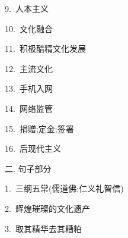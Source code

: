 \documentclass[a4paper, 12pt]{article}
\begin{document}
\begin{multicols}{2}
\begin{flushleft}
9.\ 人本主义 \ \ \ \ \underline{\hspace{3cm}}
\end{flushleft}

\begin{flushleft}
10.\ 文化融合 \ \ \ \ \underline{\hspace{3cm}}
\end{flushleft}
\end{multicols}

\begin{multicols}{2}
\begin{flushleft}
11.\ 积极醋精文化发展 \ \ \ \ \underline{\hspace{3cm}}
\end{flushleft}

\begin{flushleft}
12.\ 主流文化 \ \ \ \ \underline{\hspace{3cm}}
\end{flushleft}
\end{multicols}

\begin{multicols}{2}
\begin{flushleft}
13.\ 手机入网 \ \ \ \ \underline{\hspace{3cm}}
\end{flushleft}

\begin{flushleft}
14.\ 网络监管 \ \ \ \ \underline{\hspace{3cm}}
\end{flushleft}
\end{multicols}

\begin{multicols}{2}
\begin{flushleft}
15.\ 捐赠;定金;签署 \ \ \ \ \underline{\hspace{3cm}}
\end{flushleft}

\begin{flushleft}
16.\ 后现代主义 \ \ \ \ \underline{\hspace{3cm}}
\end{flushleft}
\end{multicols}

\Large{二. 句子部分}

\begin{flushleft}
1.\ 三纲五常(儒道佛;仁义礼智信)

\underline{\hspace{16cm}}
\end{flushleft}

\begin{flushleft}
2.\ 辉煌璀璨的文化遗产

\underline{\hspace{16cm}}
\end{flushleft}

\begin{flushleft}
3.\ 取其精华去其糟粕

\underline{\hspace{16cm}}
\end{flushleft}
\end{document}
